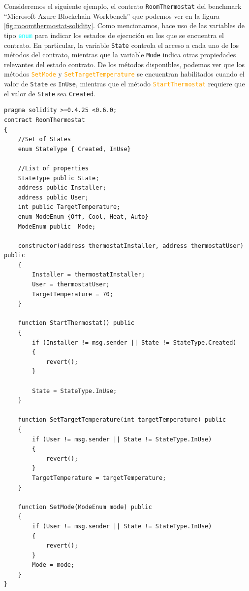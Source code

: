 Consideremos el siguiente ejemplo, el contrato \texttt{RoomThermostat} del benchmark ``Microsoft Azure Blockchain Workbench'' \cite{azure-benchmark} que podemos ver en la figura \ref{fig:rooomthermostat-solidity}.
Como mencionamos, hace uso de las variables de tipo \textcolor{cyan}{\texttt{enum}} para indicar los estados de ejecución en los que se encuentra el contrato.
En particular, la variable \texttt{State} controla el acceso a cada uno de los métodos del contrato, mientras que la variable \texttt{Mode} indica otras propiedades relevantes del estado contrato.
De los métodos disponibles, podemos ver que los métodos \textcolor{orange}{\texttt{SetMode}} y \textcolor{orange}{\texttt{SetTargetTemperature}} se encuentran habilitados cuando el valor de \texttt{State} es \texttt{InUse}, mientras que el método \textcolor{orange}{\texttt{StartThermostat}} requiere que el valor de \texttt{State} sea \texttt{Created}.

\begin{lstlisting}[language=Solidity, label={fig:rooomthermostat-solidity}, caption={Contrato Inteligente \texttt{RoomThermostat} en Solidity},captionpos=b]
pragma solidity >=0.4.25 <0.6.0;
contract RoomThermostat
{
    //Set of States
    enum StateType { Created, InUse}
    
    //List of properties
    StateType public State;
    address public Installer;
    address public User;
    int public TargetTemperature;
    enum ModeEnum {Off, Cool, Heat, Auto}
    ModeEnum public  Mode;
    
    constructor(address thermostatInstaller, address thermostatUser) public
    {
        Installer = thermostatInstaller;
        User = thermostatUser;
        TargetTemperature = 70;
    }

    function StartThermostat() public
    {
        if (Installer != msg.sender || State != StateType.Created)
        {
            revert();
        }

        State = StateType.InUse;
    }

    function SetTargetTemperature(int targetTemperature) public
    {
        if (User != msg.sender || State != StateType.InUse)
        {
            revert();
        }
        TargetTemperature = targetTemperature;
    }

    function SetMode(ModeEnum mode) public
    {
        if (User != msg.sender || State != StateType.InUse)
        {
            revert();
        }
        Mode = mode;
    }
}
\end{lstlisting}

